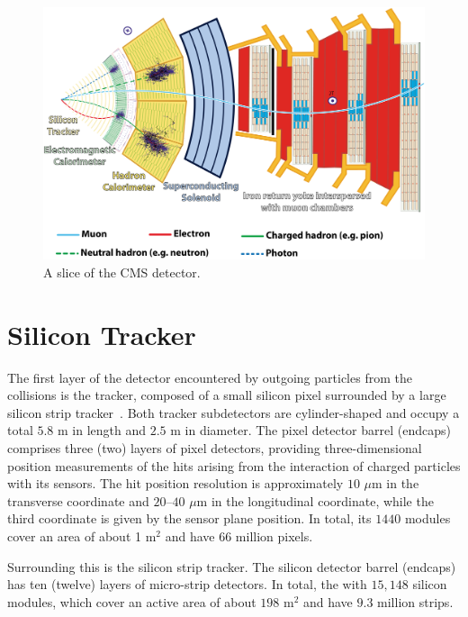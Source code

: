 \begin{figure}\centering
\includegraphics[width=.9\textwidth]{figs/cms/CMSslice_whiteBackground.png}
\caption{A slice of the CMS detector.\label{fig:CMSslice}}
\end{figure}


\section{Silicon Tracker}
\label{sec:tracker}
The first layer of the detector encountered by outgoing particles from the
collisions is the tracker, composed of a small silicon pixel
surrounded by a large silicon strip tracker~\cite{Chatrchyan:2014fea}. Both tracker subdetectors are
cylinder-shaped and occupy a total $5.8$ \unit{m} in length and $2.5$
\unit{m} in diameter. The pixel detector barrel (endcaps) comprises three (two) layers of pixel
detectors, providing three-dimensional position measurements of the
hits arising from the interaction of charged particles with its
sensors. The hit position resolution is approximately $10$ $\mu$m in
the transverse coordinate and $20–40$ $\mu$m in the longitudinal
coordinate, while the third coordinate is given by the sensor plane
position. In total, its $1440$ modules cover an area of about 1
m$^{2}$ and have $66$ million pixels.


Surrounding this is the silicon strip tracker. The silicon detector
barrel (endcaps) has ten (twelve) layers of micro-strip detectors. In
total, the with
$15,148$ silicon modules, which cover an active area of about $198$
m$^2$ and have $9.3$ million strips. 

